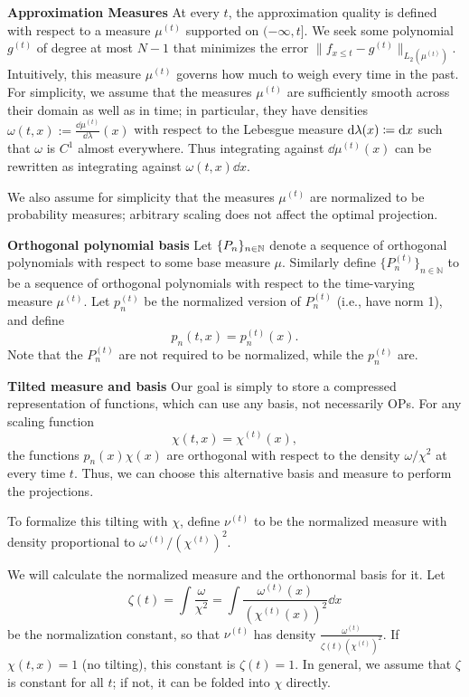 \documentclass[../hippo.tex]{subfiles}
\begin{document}
\textbf{Approximation Measures}
At every $t$, the approximation quality is defined with respect to a measure $\mu^{(t)}$ supported on $(-\infty, t]$.
We seek some polynomial $g^{(t)}$ of degree at most $N-1$ that minimizes the
error $\|f_{x \leq t} - g^{(t)}\|_{L_2(\mu^{(t)})}$.
Intuitively, this measure $\mu^{(t)}$ governs how much to weigh every time in the past.
For simplicity, we assume that the measures $\mu^{(t)}$ are sufficiently smooth across their domain as well as in time;
in particular, they have densities $\omega(t, x) := \frac{\dd \mu^{(t)}}{\dd \lambda}(x)$
with respect to the Lebesgue measure $\mathop{}\!\mathrm{d} \lambda(x) \coloneqq \mathop{}\!\mathrm{d} x$
such that $\omega$ is $C^1$ almost everywhere.
Thus integrating against $\dd \mu^{(t)}(x)$ can be rewritten as integrating against
$\omega(t, x) \dd x$.

We also assume for simplicity that the measures $\mu^{(t)}$ are normalized to be probability measures;
arbitrary scaling does not affect the optimal projection.

\textbf{Orthogonal polynomial basis}
Let $\{P_n\}_{n \in \mathbb{N}}$ denote a sequence of orthogonal polynomials with respect to some base measure $\mu$.
Similarly define $\{ P_n^{(t)} \}_{n \in \mathbb{N}}$ to be a sequence of
orthogonal polynomials with respect to the time-varying measure $\mu^{(t)}$.
Let $p_n^{(t)}$ be the normalized version of $P_n^{(t)}$ (i.e., have norm 1),
and define
\begin{equation}
  \label{eq:framework-p}
  p_n(t, x) = p_n^{(t)}(x).
\end{equation}
Note that the $P_n^{(t)}$ are not required to be normalized, while the
$p_n^{(t)}$ are.


\textbf{Tilted measure and basis}
Our goal is simply to store a compressed representation of functions, which can use any basis, not necessarily OPs.
For any scaling function
\begin{equation}
  \label{eq:framework-chi}
  \chi(t, x) = \chi^{(t)}(x)
  ,
\end{equation}
the functions $p_n(x) \chi(x)$ are orthogonal with respect to the density $\omega / \chi^2$ at every time $t$.
Thus, we can choose this alternative basis and measure to perform the projections.

To formalize this tilting with $\chi$, define $\nu^{(t)}$ to be the normalized measure with density proportional to $\omega^{(t)} / (\chi^{(t)})^2$.

We will calculate the normalized measure and the orthonormal basis for it.
Let
\begin{equation}
  \label{eq:framework-zeta}
  \zeta(t) = \int \frac{\omega}{\chi^2} = \int \frac{\omega^{(t)}(x)}{(\chi^{(t)}(x))^2} \dd x
\end{equation}
be the normalization constant,
so that $\nu^{(t)}$ has density $\frac{\omega^{(t)}}{\zeta(t) (\chi^{(t)})^2}$.
If $\chi(t, x) = 1$ (no tilting), this constant is $\zeta(t) = 1$.
In general, we assume that $\zeta$ is constant for all $t$; if not, it can
be folded into $\chi$ directly.
\end{document}
